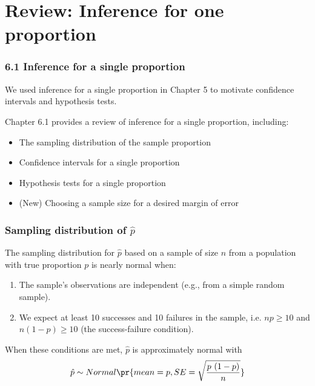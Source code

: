 \documentclass[slidestop,compress,mathserif]{beamer}
\begin{document}

\section{Review: Inference for one proportion}

\begin{frame}
\frametitle{6.1 Inference for a single proportion}
We used inference for a single proportion in Chapter 5 to motivate confidence intervals and hypothesis tests.

Chapter 6.1 provides a review of inference for a single proportion, including:
    \begin{itemize}
        \item The sampling distribution of the sample proportion
        \item Confidence intervals for a single proportion
        \item Hypothesis tests for a single proportion
        \item (New) Choosing a sample size for a desired margin of error
    \end{itemize}

\end{frame}


\begin{frame}
\frametitle{Sampling distribution of \(\hat{p}\)}

The sampling distribution for \(\hat{p}\) based on a sample of size \(n\) from a population with true proportion \(p\) is nearly normal when:

\begin{enumerate}
  \item The sample's observations are independent (e.g., from a simple random sample).
  \item We expect at least 10 successes and 10 failures in the sample, i.e. \(np \ge 10\) and \(n(1-p) \ge 10\) (the success-failure condition).
\end{enumerate}

When these conditions are met, \(\hat{p}\) is approximately normal with
\[ \hat{p} \sim Normal \pr{ mean = p, SE = \sqrt{\frac{p~(1-p)}{n}} } \]

\end{frame}

\end{document}
